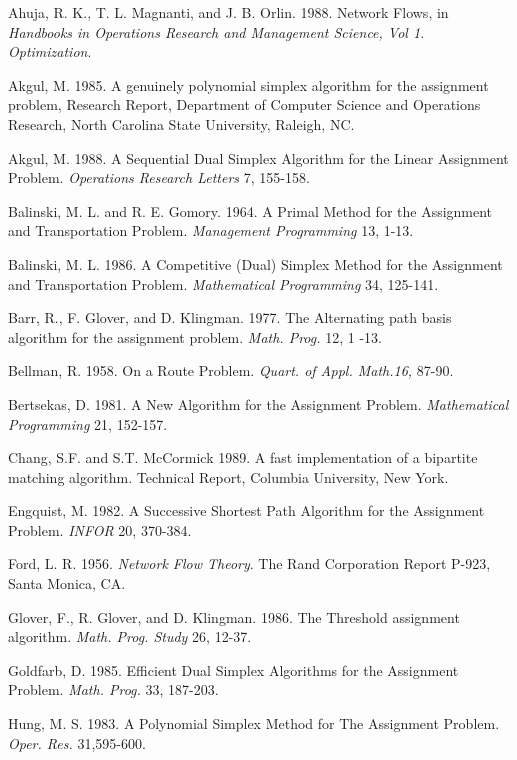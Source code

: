 \begin{thebibliography}{99}

Ahuja, R. K., T. L. Magnanti, and J. B. Orlin. 1988. Network Flows, in
{\it Handbooks in Operations
Research and Management Science, Vol 1. Optimization}.

Akgul, M. 1985. A genuinely polynomial simplex algorithm for the
assignment problem, Research Report, Department of Computer Science
and Operations Research, North Carolina State University, Raleigh, NC.

Akgul, M. 1988. A Sequential Dual Simplex Algorithm for the Linear
Assignment Problem. {\it Operations Research Letters} 7, 155-158.

Balinski, M. L. and R. E. Gomory. 1964. A Primal Method for the
Assignment and Transportation Problem. {\it Management Programming}
13, 1-13.

Balinski, M. L. 1986. A Competitive (Dual) Simplex Method for the 
Assignment and Transportation Problem. {\it Mathematical Programming}
34, 125-141.

Barr, R., F. Glover, and D. Klingman. 1977. The Alternating path basis 
algorithm  for the assignment problem. {\it Math. Prog.} 12, 1 -13.

Bellman, R. 1958. On a Route Problem. {\it Quart. of Appl. Math.16,}
87-90. 

Bertsekas, D. 1981. A New Algorithm for the  Assignment Problem.
{\it Mathematical Programming } 21, 152-157.

Chang, S.F. and S.T. McCormick 1989. A fast implementation of a 
bipartite matching algorithm. Technical Report, Columbia University,
New York.

Engquist,  M. 1982. A Successive Shortest Path Algorithm for the Assignment
Problem. 
{\it  INFOR} 20, 370-384.

Ford, L. R. 1956. {\it Network Flow Theory}. 
The Rand Corporation 
Report P-923, Santa Monica, CA.

Glover,  F., R. Glover, and D. Klingman. 1986. The Threshold assignment
algorithm. {\it Math. Prog. Study} 26, 12-37.

Goldfarb, D. 1985. Efficient Dual Simplex Algorithms for
the Assignment Problem. {\it Math. Prog. } 33, 187-203.

Hung, M. S. 1983. A Polynomial Simplex Method for The Assignment Problem.
{\it Oper. Res. } 31,595-600.


\end{thebibliography}
